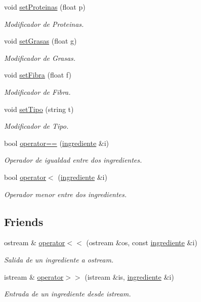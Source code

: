 \begin{DoxyCompactItemize}
void \hyperlink{classingrediente_a5ee4fac5c35f8ff71e7f974d1675a626}{set\+Proteinas} (float p)
\begin{DoxyCompactList}\small\item\em Modificador de Proteinas. \end{DoxyCompactList}\item 
void \hyperlink{classingrediente_a5b20e7a788dcdb5685c66c7362d65533}{set\+Grasas} (float g)
\begin{DoxyCompactList}\small\item\em Modificador de Grasas. \end{DoxyCompactList}\item 
void \hyperlink{classingrediente_a13928358db435d4a42b348f6ea1ee548}{set\+Fibra} (float f)
\begin{DoxyCompactList}\small\item\em Modificador de Fibra. \end{DoxyCompactList}\item 
void \hyperlink{classingrediente_ae51c71ad615844974ee24bb2fe9c7b80}{set\+Tipo} (string t)
\begin{DoxyCompactList}\small\item\em Modificador de Tipo. \end{DoxyCompactList}\item 
bool \hyperlink{classingrediente_a13e14c58eee2955d3fa0383fd704d337}{operator==} (\hyperlink{classingrediente}{ingrediente} \&i)
\begin{DoxyCompactList}\small\item\em Operador de igualdad entre dos ingredientes. \end{DoxyCompactList}\item 
bool \hyperlink{classingrediente_a6b70e6c632d6a07bb5536114948f8e3c}{operator$<$} (\hyperlink{classingrediente}{ingrediente} \&i)
\begin{DoxyCompactList}\small\item\em Operador menor entre dos ingredientes. \end{DoxyCompactList}\end{DoxyCompactItemize}
\subsection*{Friends}
\begin{DoxyCompactItemize}
\item 
ostream \& \hyperlink{classingrediente_af02aa89e83969f7073a8da7e64ad9b87}{operator$<$$<$} (ostream \&os, const \hyperlink{classingrediente}{ingrediente} \&i)
\begin{DoxyCompactList}\small\item\em Salida de un ingrediente a ostream. \end{DoxyCompactList}\item 
istream \& \hyperlink{classingrediente_a76d568aa86c9c0783c4b108b9e0f1023}{operator$>$$>$} (istream \&is, \hyperlink{classingrediente}{ingrediente} \&i)
\begin{DoxyCompactList}\small\item\em Entrada de un ingrediente desde istream. \end{DoxyCompactList}\end{DoxyCompactItemize}


